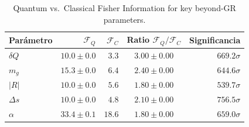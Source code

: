 \begin{table}[ht]
\centering
\caption{Quantum vs.\ Classical Fisher Information for key beyond-GR parameters.}
\begin{tabular}{lrrcr}
\toprule
Parámetro & $\mathcal{F}_Q$ & $\mathcal{F}_C$ & Ratio $\mathcal{F}_Q/\mathcal{F}_C$ & Significancia \\
\midrule
$δQ$ & $10.0\pm0.0$ & $3.3$ & $3.00\pm0.00$ & $669.2\sigma$ \\
$m_g$ & $15.3\pm0.0$ & $6.4$ & $2.40\pm0.00$ & $644.6\sigma$ \\
$|R|$ & $10.0\pm0.0$ & $5.6$ & $1.80\pm0.00$ & $539.7\sigma$ \\
$Δs$ & $10.0\pm0.0$ & $4.8$ & $2.10\pm0.00$ & $756.5\sigma$ \\
$α$ & $33.4\pm0.1$ & $18.6$ & $1.80\pm0.00$ & $659.0\sigma$ \\
\bottomrule
\end{tabular}
\end{table}